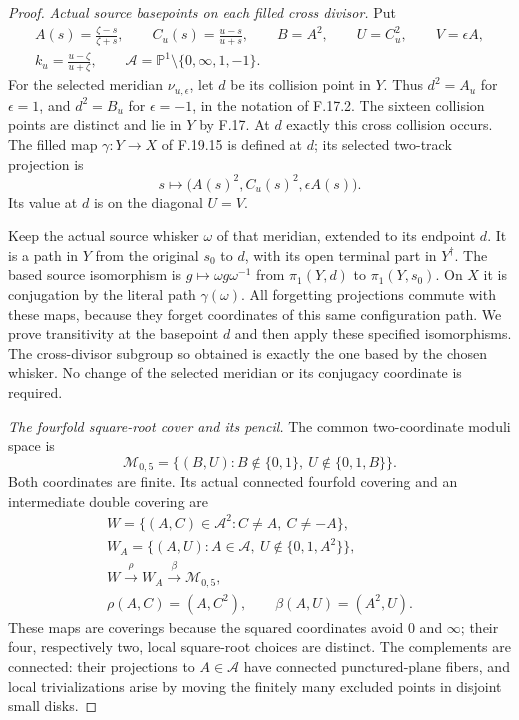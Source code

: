 \begin{proof}
\emph{Actual source basepoints on each filled cross divisor.}
Put
\[
 \begin{gathered}
 A(s)=\frac{\zeta-s}{\zeta+s},\qquad
 C_u(s)=\frac{u-s}{u+s},\qquad B=A^2,\qquad U=C_u^2,\qquad
 V=\epsilon A,\\
 k_u=\frac{u-\zeta}{u+\zeta},\qquad
 \mathscr A=\mathbb P^1\setminus\{0,\infty,1,-1\}.
 \end{gathered}                                                \tag{F.21.5}
\]
For the selected meridian $\nu_{u,\epsilon}$, let $d$ be
its collision point in $Y$. Thus $d^2=A_u$ for
$\epsilon=1$, and $d^2=B_u$ for $\epsilon=-1$, in the
notation of F.17.2. The sixteen collision points are
distinct and lie in $Y$ by F.17. At $d$ exactly this
cross collision occurs. The filled map
$\gamma:Y\to X$ of F.19.15 is defined at $d$; its
selected two-track projection is
\[
       s\longmapsto\bigl(A(s)^2,C_u(s)^2,\epsilon A(s)\bigr).
                                                               \tag{F.21.6}
\]
Its value at $d$ is on the diagonal $U=V$.

Keep the actual source whisker $\omega$ of that meridian,
extended to its endpoint $d$. It is a path in $Y$ from
the original $s_0$ to $d$, with its open terminal part
in $Y^\dagger$. The based source isomorphism is
$g\mapsto\omega g\omega^{-1}$ from $\pi_1(Y,d)$ to
$\pi_1(Y,s_0)$. On $X$ it is conjugation by the literal
path $\gamma(\omega)$. All forgetting projections
commute with these maps, because they forget coordinates
of this same configuration path. We prove transitivity
at the basepoint $d$ and then apply these specified
isomorphisms. The cross-divisor subgroup so obtained is
exactly the one based by the chosen whisker. No change
of the selected meridian or its conjugacy coordinate
is required.

\emph{The fourfold square-root cover and its pencil.}
The common two-coordinate moduli space is
\[
 \mathcal M_{0,5}
       =\{(B,U): B\notin\{0,1\},\ U\notin\{0,1,B\}\}.
\]
Both coordinates are finite. Its actual connected
fourfold covering and an intermediate double covering are
\[
 \begin{gathered}
 W=\{(A,C)\in\mathscr A^2:C\ne A,\ C\ne-A\},\\
 W_A=\{(A,U):A\in\mathscr A,\ U\notin\{0,1,A^2\}\},\\
 W\xrightarrow{\rho}W_A\xrightarrow{\beta}\mathcal M_{0,5},\\
 \rho(A,C)=(A,C^2),\qquad\beta(A,U)=(A^2,U).
 \end{gathered}                                               \tag{F.21.7}
\]
These maps are coverings because the squared coordinates
avoid $0$ and $\infty$; their four, respectively two,
local square-root choices are distinct. The complements
are connected: their projections to $A\in\mathscr A$
have connected punctured-plane fibers, and local
trivializations arise by moving the finitely many
excluded points in disjoint small disks.


\end{proof}
